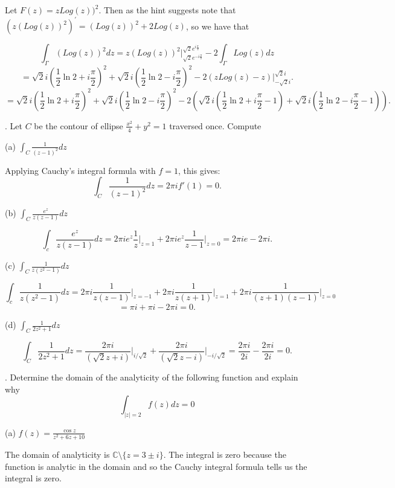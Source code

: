 \documentclass[letterpaper, reqno,11pt]{article}
\begin{document}
Let $F(z)=zLog(z))^2$. Then as the hint suggests note that $( z (Log (z))^2)^{'} = (Log (z))^2 + 2 Log (z)$, so we have that

\[
    \int_{\Gamma} (Log(z))^2dz=z(Log(z))^2\bigg|_{\sqrt{2}e^{-i\frac{\pi}{2}} }^{\sqrt{2}e^{i\frac{\pi}{2}} }-2\int_\Gamma Log(z)dz
\]
\[
=\sqrt{2}i\left( \frac{1}{2}\ln 2+i\frac{\pi}{2} \right)^2 +\sqrt{2}i\left( \frac{1}{2}\ln 2-i\frac{\pi}{2} \right)^2-2\left( zLog(z)-z \right)\bigg|_{-\sqrt{2} i}^{\sqrt{2} i}
.\]
\[
=\sqrt{2}i\left( \frac{1}{2}\ln 2+i\frac{\pi}{2} \right)^2 +\sqrt{2}i\left( \frac{1}{2}\ln 2-i\frac{\pi}{2} \right)^2-2\left( \sqrt{2} i\left( \frac{1}{2}\ln 2+i \frac{\pi}{2}-1 \right) +\sqrt{2} i\left( \frac{1}{2}\ln 2-i \frac{\pi}{2}-1 \right) \right) 
.\]




\medskip

. Let $C$ be the contour of ellipse $ \frac{x^2}{4}+ y^2=1$ traversed once. Compute

(a) $ \int_C \frac{ 1 }{ (z-1)^2 } dz$

Applying Cauchy's integral formula with $f=1$, this gives: 
\[
\int_C \frac{1}{(z-1)^2}dz=2\pi if'(1)=0
.\]

(b) $ \int_C \frac{ e^z }{ z (z-1) } dz$

\[
\int_c \frac{e^{z}}{z(z-1)}dz=2\pi i e^{z} \frac{1}{z}\bigg|_{z=1} +2\pi i e^{z}\frac{1}{z-1}\bigg|_{z=0}=2\pi ie-2\pi i
.\]

(c) $ \int_C \frac{ 1 }{ z (z^2-1) } dz$

\[
\int_c \frac{1}{z(z^2-1)}dz=2\pi i  \frac{1}{z(z-1)}\bigg|_{z=-1}+2\pi i  \frac{1}{z(z+1)}\bigg|_{z=1} +2\pi i \frac{1}{(z+1)(z-1)}\bigg|_{z=0} 
\]
\[
=\pi i+\pi i -2\pi i=0
.\]

(d) $ \int_{C} \frac{1}{ 2z^2+1} dz $

\[
\int_{C} \frac{1}{ 2z^2+1} dz=\frac{2\pi i}{\left(\sqrt{2} z+i  \right) }\bigg|_{i/\sqrt{2} }+\frac{2\pi i}{\left(\sqrt{2} z-i  \right) }\bigg|_{-i /\sqrt{2} }=\frac{2\pi i}{2i}-\frac{2 \pi i}{2i}=0
.\]


\medskip

. Determine the domain of the analyticity of the following function and explain why
$$ \int_{|z|=2} f(z) dz=0 $$

(a) $f(z)=\frac{\cos z}{ z^2+6z+10}$

The domain of analyticity is $\mathbb{C}\setminus \{ z=3\pm i \} $. The integral is zero because the function is analytic in the domain and so the Cauchy integral formula tells us the integral is zero. 
\end{document}
